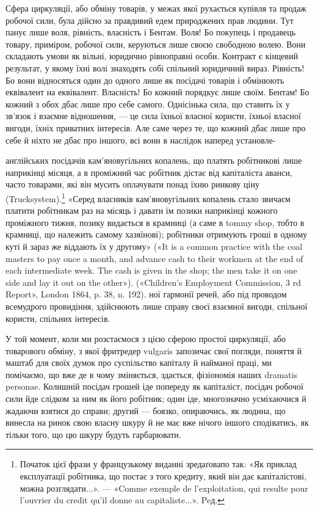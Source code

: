 Сфера циркуляції, або обміну товарів, у межах якої рухається
купівля та продаж робочої сили, була дійсно за правдивий
едем природжених прав людини. Тут панує лише воля, рівність,
власність і Бентам. Воля! Бо покупець і продавець товару, приміром,
робочої сили, керуються лише своєю свободною волею.
Вони складають умови як вільні, юридично рівноправні особи.
Контракт є кінцевий результат, у якому їхні волі знаходять собі
спільний юридичний вираз. Рівність! Бо вони відносяться один
до одного лише як посідачі товарів і обмінюють еквівалент на
еквівалент. Власність! Бо кожний порядкує лише своїм. Бентам!
Бо кожний з обох дбає лише про себе самого. Однісінька
сила, що ставить їх у зв’язок і взаємне відношення, — це сила
їхньої власної користи, їхньої власної вигоди, їхніх приватних
інтересів. Але саме через те, що кожний дбає лише про себе й
ніхто не дбає про іншого, всі вони в наслідок наперед установле-

англійських посідачів кам’яновугільних копалень, що платять робітникові
лише наприкінці місяця, а в проміжний час робітник дістає від капіталіста
аванси, часто товарами, які він мусить оплачувати понад їхню
ринкову ціну (Trucksystem).\footnote*{
Початок цієї фрази у французькому виданні зредаґовапо так: «Як
приклад експлуатації робітника, що постає з того кредиту, який він дає
капіталістові, можна розглядати...». — «Comme exemple de l’exploitation,
qui resulte pour l’ouvrier du credit qu’il donne au capitaliste...». Peд.
} «Серед власників кам’яновугільних копалень
стало звичаєм платити робітникам раз на місяць і давати їм позики
наприкінці кожного проміжного тижня, позику видається в крамниці
(а саме в tommy shop, тобто в крамниці, що належить самому хазяїнові);
робітники отримують гроші в одному куті й зараз же віддають їх у другому»
(«It is a common practice with the coal masters to pay once a month,
and advance cash to their workmen at the end of each intermediate week.
The cash is given in the shop; the men take it on one side and lay it out on
the other»). («Children’s Employment Commission, 3 rd Report», London
1864, p. 38, n. 192).
ної гармонії речей, або під проводом всемудрого провидіння,
здійснюють лише справу своєї взаємної вигоди, спільної користи,
спільних інтересів.

У той момент, коли ми розстаємося з цією сферою простої
циркуляції, або товарового обміну, з якої фритредер vulgaris
запозичає свої погляди, поняття й маштаб для своїх думок про
суспільство капіталу й найманої праці, ми помічаємо, що вже де
в чому зміняється, здається, фізіономія наших dramatis personae.
Колишній посідач грошей іде попереду як капіталіст, посідач
робочої сили йде слідком за ним як його робітник; один іде,
многозначно усміхаючися й жадаючи взятися до справи; другий —
боязко, опираючись, як людина, що винесла на ринок свою власну
шкуру й не має вже нічого іншого сподіватись, як тільки того,
що цю шкуру будуть гарбарювати.
